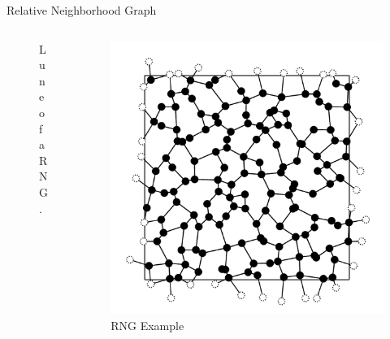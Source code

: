 \documentclass{beamer}
\begin{document}
        \begin{frame}{Relative Neighborhood Graph}
            \begin{columns}[b]
                \begin{column}{5cm}
                    \begin{figure}[htbp]
                        \centering
                        
                        \caption
                        {
                            Lune of a RNG.
                        }
                    \end{figure}
                \end{column}
                \begin{column}{5cm}
                    \begin{figure}[htbp]
                        \centering
                        \includegraphics[width=1\textwidth]{images/RNG/L12S03.pdf}
                        \caption
                        {
                            RNG Example
                        }
                    \end{figure}
                \end{column}
            \end{columns}
        \end{frame}
\end{document}
